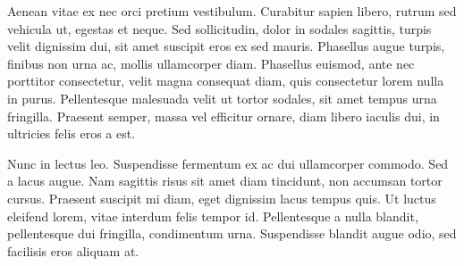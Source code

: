 \documentclass{report}
\begin{document}
Aenean vitae ex nec orci pretium vestibulum. Curabitur sapien libero, rutrum sed vehicula ut, egestas et neque. Sed sollicitudin, dolor in sodales sagittis, turpis velit dignissim dui, sit amet suscipit eros ex sed mauris. Phasellus augue turpis, finibus non urna ac, mollis ullamcorper diam. Phasellus euismod, ante nec porttitor consectetur, velit magna consequat diam, quis consectetur lorem nulla in purus. Pellentesque malesuada velit ut tortor sodales, sit amet tempus urna fringilla. Praesent semper, massa vel efficitur ornare, diam libero iaculis dui, in ultricies felis eros a est.

Nunc in lectus leo. Suspendisse fermentum ex ac dui ullamcorper commodo. Sed a lacus augue. Nam sagittis risus sit amet diam tincidunt, non accumsan tortor cursus. Praesent suscipit mi diam, eget dignissim lacus tempus quis. Ut luctus eleifend lorem, vitae interdum felis tempor id. Pellentesque a nulla blandit, pellentesque dui fringilla, condimentum urna. Suspendisse blandit augue odio, sed facilisis eros aliquam at.
\end{document}
